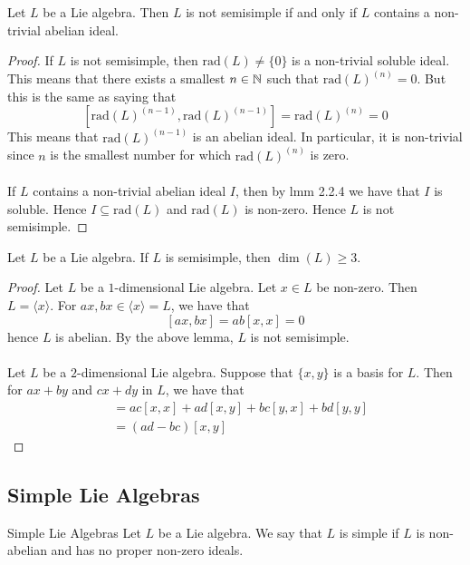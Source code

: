 \documentclass[a4paper]{article}
\begin{document}
\begin{lmm}{}{} Let $L$ be a Lie algebra. Then $L$ is not semisimple if and only if $L$ contains a non-trivial abelian ideal. \tcbline
\begin{proof}
If $L$ is not semisimple, then $\text{rad}(L)\neq\{0\}$ is a non-trivial soluble ideal. This means that there exists a smallest $n\in\mathbb{N}$ such that $\text{rad}(L)^{(n)}=0$. But this is the same as saying that $$[\text{rad}(L)^{(n-1)},\text{rad}(L)^{(n-1)}]=\text{rad}(L)^{(n)}=0$$ This means that $\text{rad}(L)^{(n-1)}$ is an abelian ideal. In particular, it is non-trivial since $n$ is the smallest number for which $\text{rad}(L)^{(n)}$ is zero. \\~\\

If $L$ contains a non-trivial abelian ideal $I$, then by lmm 2.2.4 we have that $I$ is soluble. Hence $I\subseteq\text{rad}(L)$ and $\text{rad}(L)$ is non-zero. Hence $L$ is not semisimple. 
\end{proof}
\end{lmm}

\begin{prp}{}{} Let $L$ be a Lie algebra. If $L$ is semisimple, then $\dim(L)\geq 3$. \tcbline
\begin{proof}
Let $L$ be a $1$-dimensional Lie algebra. Let $x\in L$ be non-zero. Then $L=\langle x\rangle$. For $ax,bx\in\langle x\rangle=L$, we have that $$[ax,bx]=ab[x,x]=0$$ hence $L$ is abelian. By the above lemma, $L$ is not semisimple. \\~\\

Let $L$ be a $2$-dimensional Lie algebra. Suppose that $\{x,y\}$ is a basis for $L$. Then for $ax+by$ and $cx+dy$ in $L$, we have that 
\begin{align*}
[ax+by,cx+dy]&=ac[x,x]+ad[x,y]+bc[y,x]+bd[y,y]\\
&=(ad-bc)[x,y]
\end{align*}
\end{proof}
\end{prp}

\subsection{Simple Lie Algebras}
\begin{defn}{Simple Lie Algebras}{} Let $L$ be a Lie algebra. We say that $L$ is simple if $L$ is non-abelian and has no proper non-zero ideals. 
\end{defn}
\end{document}
